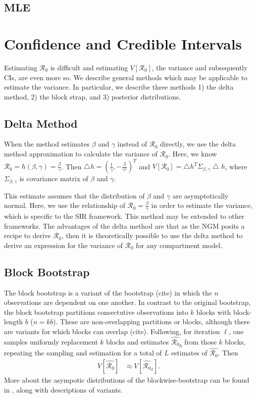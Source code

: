 \documentclass[12pt]{article}
\newcommand{\rr}{\ensuremath{\mathcal{R}_0}}
\begin{document}
\subsection{MLE}



\section{Confidence and Credible Intervals}
\label{sec:ci}

Estimating $\rr$ is difficult and estimating $V[\rr]$, the variance and subsequently CIs, are even more so.  We describe general methods which may be applicable to estimate the variance.  In particular, we describe three methods 1) the delta method, 2) the block strap, and 3) posterior distributions.


\subsection{Delta Method}\label{delta-method}

When the method estimates \(\beta\) and \(\gamma\) instead of \(\rr\) directly, we use the delta method approximation to calculate the
variance of \(\rr\). Here, we know \(\rr = h(\beta, \gamma) = \frac{\beta}{\gamma}\). Then \(\bigtriangleup h = (\frac{1}{\gamma},  -\frac{\beta}{\gamma^2})^T\) and \(V[\rr] = \bigtriangleup h^T \Sigma_{\beta, \gamma} \bigtriangleup h\), where \(\Sigma_{\beta, \gamma}\) is covariance matrix of \(\beta\) and \(\gamma\).

This estimate assumes that the distribution of $\beta$ and $\gamma$ are asymptotically normal.  Here, we use the relationship of $\rr = \frac{\beta}{\gamma}$ in order to estimate the variance, which is specific to the SIR framework.  This method may be extended to other frameworks.  The advantages of the delta method are that as the NGM posits a recipe to derive $\rr$, then it is theoretically possible to use the delta method to derive an expression for the variance of $\rr$ for any compartment model.

\subsection{Block Bootstrap}

The block bootstrap is a variant of the bootstrap (cite) in which the $n$ observations are dependent on one another.  In contrast to the original bootstrap, the block bootstrap partitions consectutive observations into $k$ blocks with block-length $b$ ($n=kb$).  These are non-overlapping partitions or blocks, although there are variants for which blocks can overlap (cite).  Following, for iteration $\ell$, one samples uniformly replacement $k$ blocks and estimates $\hat{\rr}_b$ from those $k$ blocks, repeating the sampling and estimation for a total of $L$ estimates of $\hat{\rr}$.  Then
\begin{align*}
  V\left [ \hat{\rr} \right ] &\approx V\left [\hat{\rr}_\ell \right ].
\end{align*}
More about the asympotic distributions of the blockwise-bootstrap can be found in \cite{cao1999}, along with descriptions of variants.
\end{document}
